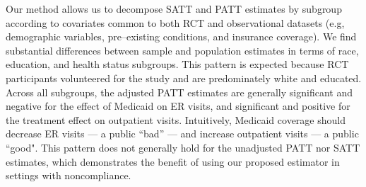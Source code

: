 \documentclass[12pt]{article}
\begin{document}
Our method allows us to decompose SATT and PATT estimates by subgroup according to covariates common to both RCT and observational datasets (e.g, demographic variables, pre--existing conditions, and insurance coverage). We find substantial differences between sample and population estimates in terms of race, education, and health status subgroups. This pattern is expected because RCT participants volunteered for the study and are predominately white and educated.  Across all subgroups, the adjusted PATT estimates are generally significant and negative for the effect of Medicaid on ER visits, and significant and positive for the treatment effect on outpatient visits. Intuitively, Medicaid coverage should decrease ER visits --- a public ``bad'' --- and increase outpatient visits --- a public ``good". This pattern does not generally hold for the unadjusted PATT nor SATT estimates, which demonstrates the benefit of using our proposed estimator in settings with noncompliance. 

\pagebreak



\end{document}
